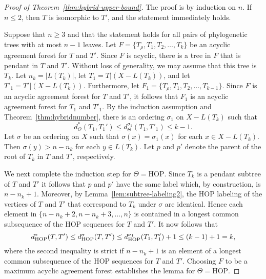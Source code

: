 \documentclass{article}
\newcommand{\HOP}{\mathrm{HOP}}
\begin{document}
\begin{proof}[Proof of Theorem~\ref{thm:hybrid-upper-bound}]
The proof is by induction on $n$. If $n \leq 2$, then $T$ is isomorphic to $T'$, and the statement immediately holds. 

Suppose that $n\ge 3$ and that the statement holds for all pairs of phylogenetic trees with at most $n-1$ leaves.
Let $F=\{T_{\rho}, T_1, T_2, \ldots, T_k\}$ be an acyclic agreement forest for $T$ and $T'$. Since $F$ is acyclic, there is a tree in $F$ that is pendant in $T$ and $T'$. Without loss of generality, we may assume that this tree is $T_k$. Let $n_k=|L(T_k)|$, let $T_1=T|(X- L(T_k))$, and let $T'_1=T'|(X- L(T_k))$. Furthermore, let $F_1=\{T_{\rho}, T_1, T_2, \ldots, T_{k-1}\}$. Since $F$ is an acyclic agreement forest for $T$ and $T'$, it follows that $F_1$ is an acyclic agreement forest for $T_1$ and $T'_1$. By the induction assumption and Theorem~\ref{thm:hybridnumber}, there is an ordering $\sigma_1$ on $X - L(T_k)$ such that
\begin{equation}\label{eq:one}
d_\Theta^*(T_1,T_1')\leq d^{\sigma_1}_\Theta(T_1, T'_1)\leq k-1.
\end{equation}
Let $\sigma$ be an ordering on $X$ such that $\sigma(x)=\sigma_1(x)$ for each $x\in X-L(T_k)$. Then $\sigma(y)>n-n_k$ for each $y\in L(T_k)$. Let $p$ and $p'$ denote the parent of the root of $T_k$ in $T$ and $T'$, respectively.  

We next complete the induction step for $\Theta=\HOP$. Since  $T_k$ is a pendant subtree of $T$ and $T'$ it follows  that $p$ and $p'$ have the same label which, by construction, is $n-n_k+1$.  Moreover, by Lemma~\ref{lem:subtree-labeling2}, the HOP labeling of the  vertices of $T$ and $T'$ that correspond to $T_k$  under $\sigma$ are identical. Hence each element in $\{n-n_k+2,n-n_k+3,\ldots,n\}$ is contained in a longest  common subsequence of the HOP sequences for $T$ and $T'$. It now follows that $$d^*_\HOP(T, T')\leq d^{\sigma}_{\rm HOP}(T, T')  \leq d^{\sigma_1}_{\rm HOP}(T_1, T'_1) + 1 \le (k-1) + 1 = k,$$ where the second inequality is strict if $n-n_k+1$ is an element of a longest common subsequence of the HOP sequences for $T$ and $T'$. 
Choosing $F$ to be a maximum acyclic agreement forest establishes the lemma for $\Theta=\HOP$.


\end{proof}
\end{document}
